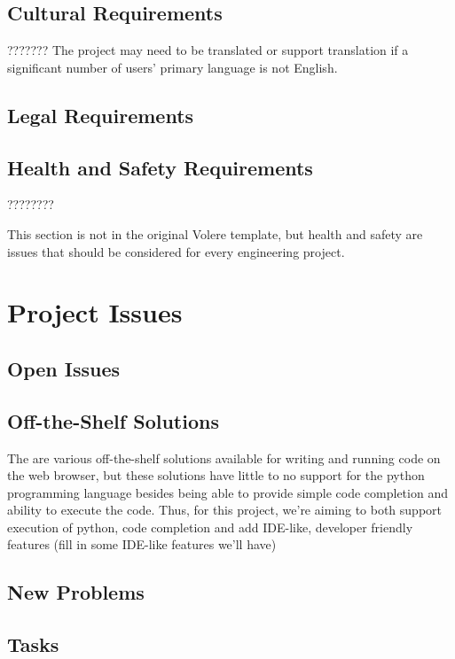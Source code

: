 \documentclass[12pt, titlepage]{article}
\begin{document}
  \subsection{Cultural Requirements}
  \HUGE ???????
  The project may need to be translated or support translation if a significant
  number of users' primary language is not English.

  \subsection{Legal Requirements}

  \subsection{Health and Safety Requirements}
  \HUGE ????????

  This section is not in the original Volere template, but health and safety are
  issues that should be considered for every engineering project.

\section{Project Issues}

  \subsection{Open Issues}

  \subsection{Off-the-Shelf Solutions}
  The are various off-the-shelf solutions available for writing and running
  code on the web browser, but these solutions have little to no support for
  the python programming language besides being able to provide simple code
  completion and ability to execute the code. Thus, for this project, we're
  aiming to both support execution of python, code completion and add IDE-like,
  developer friendly features ({\huge fill in some IDE-like features we'll
  have})

  \subsection{New Problems}

  \subsection{Tasks}
\end{document}
